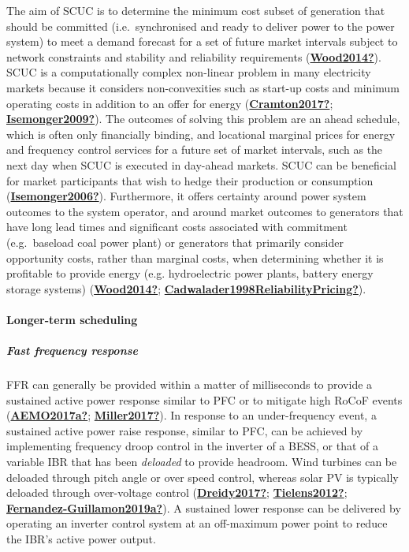 \documentclass[12pt,a4paper,]{report}
\begin{document}
The aim of SCUC is to determine the minimum cost subset of generation
that should be committed (i.e.~synchronised and ready to deliver power
to the power system) to meet a demand forecast for a set of future
market intervals subject to network constraints and stability and
reliability requirements
(\protect\hyperlink{ref-Wood2014}{\textbf{Wood2014?}}). SCUC is a
computationally complex non-linear problem in many electricity markets
because it considers non-convexities such as start-up costs and minimum
operating costs in addition to an offer for energy
(\protect\hyperlink{ref-Cramton2017}{\textbf{Cramton2017?}};
\protect\hyperlink{ref-Isemonger2009}{\textbf{Isemonger2009?}}). The
outcomes of solving this problem are an ahead schedule, which is often
only financially binding, and locational marginal prices for energy and
frequency control services for a future set of market intervals, such as
the next day when SCUC is executed in day-ahead markets. SCUC can be
beneficial for market participants that wish to hedge their production
or consumption
(\protect\hyperlink{ref-Isemonger2006}{\textbf{Isemonger2006?}}).
Furthermore, it offers certainty around power system outcomes to the
system operator, and around market outcomes to generators that have long
lead times and significant costs associated with commitment
(e.g.~baseload coal power plant) or generators that primarily consider
opportunity costs, rather than marginal costs, when determining whether
it is profitable to provide energy (e.g. hydroelectric power plants,
battery energy storage systems)
(\protect\hyperlink{ref-Wood2014}{\textbf{Wood2014?}};
\protect\hyperlink{ref-Cadwalader1998ReliabilityPricing}{\textbf{Cadwalader1998ReliabilityPricing?}}).

\hypertarget{longer-term-scheduling}{%
\paragraph{Longer-term scheduling}\label{longer-term-scheduling}}

\hypertarget{fast-frequency-response}{%
\subparagraph{Fast frequency response}\label{fast-frequency-response}}

FFR can generally be provided within a matter of milliseconds to provide
a sustained active power response similar to PFC or to mitigate high
RoCoF events (\protect\hyperlink{ref-AEMO2017a}{\textbf{AEMO2017a?}};
\protect\hyperlink{ref-Miller2017}{\textbf{Miller2017?}}). In response
to an under-frequency event, a sustained active power raise response,
similar to PFC, can be achieved by implementing frequency droop control
in the inverter of a BESS, or that of a variable IBR that has been
\emph{deloaded} to provide headroom. Wind turbines can be deloaded
through pitch angle or over speed control, whereas solar PV is typically
deloaded through over-voltage control
(\protect\hyperlink{ref-Dreidy2017}{\textbf{Dreidy2017?}};
\protect\hyperlink{ref-Tielens2012}{\textbf{Tielens2012?}};
\protect\hyperlink{ref-Fernandez-Guillamon2019a}{\textbf{Fernandez-Guillamon2019a?}}).
A sustained lower response can be delivered by operating an inverter
control system at an off-maximum power point to reduce the IBR's active
power output.
\end{document}
